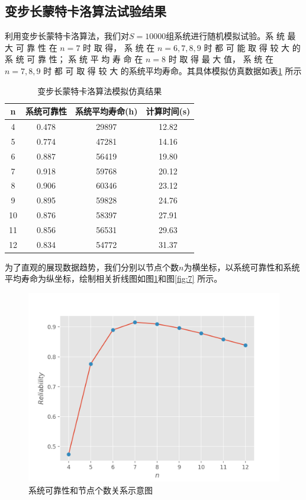 \documentclass[10.5pt,twocolumn]{jbuaa}
\begin{document}
\subsection{变步长蒙特卡洛算法试验结果}
利用变步长蒙特卡洛算法，我们对$S = 10000$组系统进行随机模拟试验。系 统 最 ⼤ 可 靠 性 在 $n = 7$ 时 取 得， 系 统 在 $n = 6, 7, 8, 9$ 时 都 可 能 取 得 较 ⼤ 的 系 统 可 靠 性； 系 统 平 均 寿 命 在 $n = 8$ 时 取 得 最 ⼤ 值， 系 统 在 $n = 7, 8, 9$ 时 都 可 取 得 较 ⼤ 的系统平均寿命。其具体模拟仿真数据如表\ref{table:2} 所⽰
\begin{table}[H]
	\centering
	\label{table:2}
	\caption{变步长蒙特卡洛算法模拟仿真结果}
	\vspace{0.2cm}
	\begin{tabular}{c|c|c|c}
	\hline
	n & \kai 系统可靠性 & \kai 系统平均寿命(h) & \kai 计算时间(s) \\
	\hline
	4 & 0.478 & 29897 & 12.82\\
	\hline
	5 & 0.774 & 47281 & 14.16\\
	\hline
	6 & 0.887 & 56419 & 19.80\\
	\hline
	7 & 0.918 & 59768 & 20.12\\
	\hline
	8 & 0.906 & 60346 & 23.12\\
	\hline
	9 & 0.895 & 59828 & 24.76\\
	\hline
	10 & 0.876 & 58397 & 27.91\\
	\hline
	11 & 0.856 & 56531 & 29.63\\
	\hline
	12 & 0.834 & 54772 & 31.37\\
	\hline
		
	\end{tabular}
\end{table}
为了直观的展现数据趋势，我们分别以节点个数$n$为横坐标，以系统可靠性和系统平均寿命为纵坐标，绘制相关折线图如图\ref{fig:6}和图\ref{fig:7} 所示。
\begin{figure}[H]
	\centering
	\includegraphics[scale = 0.6]{fig4}
	\caption{系统可靠性和节点个数关系示意图}
	\label{fig:6}
\end{figure}
\end{document}
